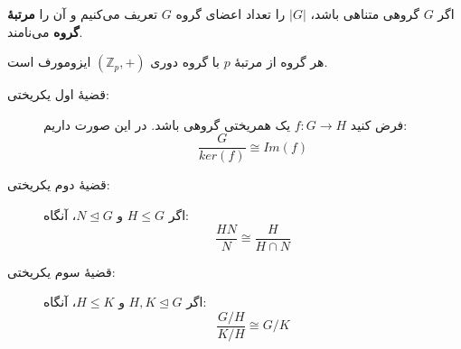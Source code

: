 \begin{frame}
    \begin{definition}
        اگر
        $G$
        گروهی متناهی باشد،
        $|G|$
        را تعداد اعضای گروه
        $G$
        تعریف می‌کنیم و آن را
        \textbf{مرتبهٔ گروه} می‌نامند.
    \end{definition}



    \begin{example}
        هر گروه از مرتبهٔ
        $p$
        با گروه دوری $(\mathbb{Z}_p,+)$ ایزومورف است.
    \end{example}



\end{frame}

\begin{frame}
    \begin{theorem}
        \begin{description}
            \item[قضیهٔ اول یکریختی:]
                  فرض کنید $f \colon G \to H$ یک همریختی گروهی باشد. در این صورت داریم:
                  \[
                      \frac{G}{ker(f)} \cong Im(f)
                  \]

            \item[قضیهٔ دوم یکریختی:]
                  اگر $H \leq G$ و $N \trianglelefteq G$، آنگاه:
                  \[
                      \frac{HN}{N} \cong \frac{H}{H \cap N}
                  \]

            \item[قضیهٔ سوم یکریختی:]
                  اگر
                  $H, K \trianglelefteq G$
                  و
                  $H \leq K $، آنگاه:
                  \[
                      \frac{G/H}{K/H} \cong G/K
                  \]
        \end{description}
    \end{theorem}



\end{frame}

